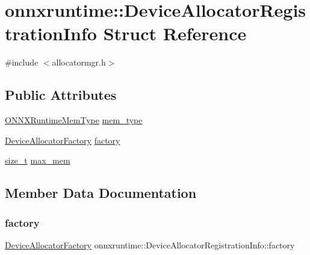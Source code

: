\hypertarget{structonnxruntime_1_1DeviceAllocatorRegistrationInfo}{}\section{onnxruntime\+:\+:Device\+Allocator\+Registration\+Info Struct Reference}
\label{structonnxruntime_1_1DeviceAllocatorRegistrationInfo}


{\ttfamily \#include $<$allocatormgr.\+h$>$}

\subsection*{Public Attributes}
\begin{DoxyCompactItemize}
\item 
\mbox{\hyperlink{allocator__info_8h_add3f8ee3ff93395704abae71c30cab18}{O\+N\+N\+X\+Runtime\+Mem\+Type}} \mbox{\hyperlink{structonnxruntime_1_1DeviceAllocatorRegistrationInfo_acdc9f0b2ccafe7d97bbcb05d4b1376cc}{mem\+\_\+type}}
\item 
\mbox{\hyperlink{namespaceonnxruntime_ae1af56abbcfb3524284e0de4567f94ac}{Device\+Allocator\+Factory}} \mbox{\hyperlink{structonnxruntime_1_1DeviceAllocatorRegistrationInfo_adf3aa62152b5bbf502df2c20d86788ed}{factory}}
\item 
\mbox{\hyperlink{mlasi_8h_a503efbc1c6e50825320ad909366b78ab}{size\+\_\+t}} \mbox{\hyperlink{structonnxruntime_1_1DeviceAllocatorRegistrationInfo_abd05ce11403fb2a987630bb90c4f8e1d}{max\+\_\+mem}}
\end{DoxyCompactItemize}


\subsection{Member Data Documentation}
\mbox{\label{structonnxruntime_1_1DeviceAllocatorRegistrationInfo_adf3aa62152b5bbf502df2c20d86788ed}} 
\subsubsection{\texorpdfstring{factory}{factory}}
{\footnotesize\ttfamily \mbox{\hyperlink{namespaceonnxruntime_ae1af56abbcfb3524284e0de4567f94ac}{Device\+Allocator\+Factory}} onnxruntime\+::\+Device\+Allocator\+Registration\+Info\+::factory}

